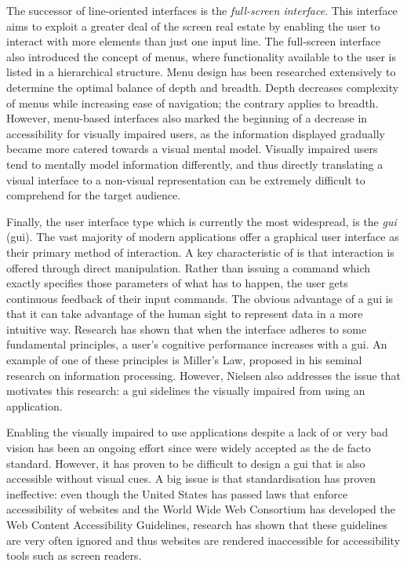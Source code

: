 The successor of line-oriented interfaces is the \textit{full-screen interface}. This interface aims to exploit a greater deal of the screen real estate by enabling the user to interact with more elements than just one input line. The full-screen interface also introduced the concept of menus, where functionality available to the user is listed in a hierarchical structure. Menu design has been researched extensively to determine the optimal balance of depth and breadth\cite{paap1986optimal, landauer1985selection, fisher1990optimal}. Depth decreases complexity of menus while increasing ease of navigation; the contrary applies to breadth. However, menu-based interfaces also marked the beginning of a decrease in accessibility for visually impaired users, as the information displayed gradually became more catered towards a visual mental model. Visually impaired users tend to mentally model information differently, and thus directly translating a visual interface to a non-visual representation can be extremely difficult to comprehend for the target audience\cite{edwards1994providing}.

Finally, the user interface type which is currently the most widespread, is the \textit{\acrlong{gui}} (\acrshort{gui}). The vast majority of modern applications offer a graphical user interface as their primary method of interaction. A key characteristic of  is that interaction is offered through direct manipulation. Rather than issuing a command which exactly specifies those parameters of what has to happen, the user gets continuous feedback of their input commands. The obvious advantage of a \acrshort{gui} is that it can take advantage of the human sight to represent data in a more intuitive way. Research has shown that when the interface adheres to some fundamental principles, a user's cognitive performance increases with a \acrshort{gui}. An example of one of these principles is Miller's Law, proposed in his seminal research on information processing\cite{miller1956magical}. However, Nielsen also addresses the issue that motivates this research: a \acrshort{gui} sidelines the visually impaired from using an application.

Enabling the visually impaired to use applications despite a lack of or very bad vision has been an ongoing effort since  were widely accepted as the de facto standard\cite{boyd1990graphical}. However, it has proven to be difficult to design a \acrshort{gui} that is also accessible without visual cues. A big issue is that standardisation has proven ineffective: even though the United States has passed laws that enforce accessibility of websites\cite{Secti81:online} and the World Wide Web Consortium has developed the Web Content Accessibility Guidelines\cite{WebCo83:online}, research has shown that these guidelines are very often ignored and thus websites are rendered inaccessible for accessibility tools such as screen readers\cite{leuthold2008beyond}.

